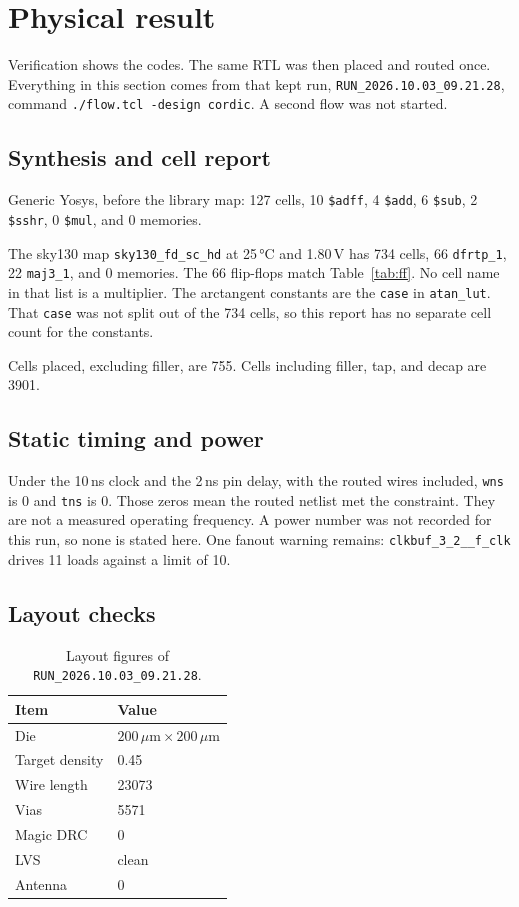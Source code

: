 \documentclass[11pt,a4paper]{article}
\begin{document}
\section{Physical result}

Verification shows the codes. The same RTL was then placed and routed once. Everything in this section comes from that kept run, \texttt{RUN\_2026.10.03\_09.21.28}, command \texttt{./flow.tcl -design cordic}. A second flow was not started.

\subsection{Synthesis and cell report}
Generic Yosys, before the library map: 127 cells, 10 \texttt{\$adff}, 4 \texttt{\$add}, 6 \texttt{\$sub}, 2 \texttt{\$sshr}, 0 \texttt{\$mul}, and 0 memories.

The sky130 map \texttt{sky130\_fd\_sc\_hd} at 25\,°C and 1.80\,V has 734 cells, 66 \texttt{dfrtp\_1}, 22 \texttt{maj3\_1}, and 0 memories. The 66 flip-flops match Table~\ref{tab:ff}. No cell name in that list is a multiplier. The arctangent constants are the \texttt{case} in \texttt{atan\_lut}. That \texttt{case} was not split out of the 734 cells, so this report has no separate cell count for the constants.

Cells placed, excluding filler, are 755. Cells including filler, tap, and decap are 3901.

\subsection{Static timing and power}
Under the 10\,ns clock and the 2\,ns pin delay, with the routed wires included, \texttt{wns} is 0 and \texttt{tns} is 0. Those zeros mean the routed netlist met the constraint. They are not a measured operating frequency. A power number was not recorded for this run, so none is stated here. One fanout warning remains: \texttt{clkbuf\_3\_2\_\_f\_clk} drives 11 loads against a limit of 10.

\subsection{Layout checks}
\begin{table}[ht]
\centering
\caption{Layout figures of \texttt{RUN\_2026.10.03\_09.21.28}.}
\label{tab:layout}
\begin{tabular}{ll}
\toprule
Item & Value \\
\midrule
Die & \(200\,\mu\mathrm{m} \times 200\,\mu\mathrm{m}\) \\
Target density & 0.45 \\
Wire length & 23073 \\
Vias & 5571 \\
Magic DRC & 0 \\
LVS & clean \\
Antenna & 0 \\
\bottomrule
\end{tabular}
\end{table}
\end{document}
